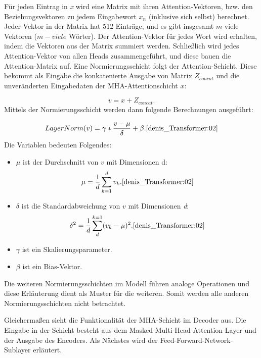 Für jeden Eintrag in \textit{x} wird eine Matrix mit ihren Attention-Vektoren, bzw. den Beziehungsvektoren zu jedem Eingabewort $x_n$ (inklusive sich selbst) berechnet. Jeder Vektor in der Matrix hat 512 Einträge, und es gibt insgesamt $m$-viele Vektoren ($m-viele$ Wörter). Der Attention-Vektor für jedes Wort wird erhalten, indem die Vektoren aus der Matrix summiert werden. Schließlich wird jedes Attention-Vektor von allen Heads zusammengeführt, und diese bauen die Attention-Matrix auf. Eine Normierungsschicht folgt der Attention-Schicht. Diese bekommt als Eingabe die konkatenierte Ausgabe von Matrix $Z_{concat}$ und die unveränderten Eingabedaten der MHA-Attentionschicht $x$:

\begin{equation}
	v = x + Z_{concat}.
\end{equation}
Mittels der Normierungsschicht werden dann folgende Berechnungen ausgeführt:

\begin{equation}
	LayerNorm(v) = \gamma * \frac{v - \mu}{\delta} + \beta. \cite{denis_Transformer:02}
\end{equation}
Die Variablen bedeuten Folgendes:

\begin{itemize}[leftmargin=1cm]
		\item $\mu$ ist der Durchschnitt von $v$ mit Dimensionen d:
		\begin{equation}
			\mu = \frac{1}{d}\sum_{k=1}^{d} v_k. \cite{denis_Transformer:02}
		\end{equation}
		\item $\delta$ ist die Standardabweichung von $v$ mit Dimensionen \textit{d}:
		\begin{equation}
			\delta^2 = \frac{1}{d}\sum_{d}^{k=1} (v_k - \mu)^2. \cite{denis_Transformer:02}
		\end{equation}
		\item $\gamma$ ist ein Skalierungsparameter.
		\item $\beta$ ist ein Bias-Vektor.
\end{itemize}

Die weiteren Normierungsschichten im Modell führen analoge Operationen und diese Erläuterung dient als Muster für die weiteren. Somit werden alle anderen Normierungsschichten nicht betrachtet.

Gleichermaßen sieht die Funktionalität der MHA-Schicht im Decoder aus. Die Eingabe in der Schicht besteht aus dem Masked-Multi-Head-Attention-Layer und der Ausgabe des Encoders. Als Nächstes wird der Feed-Forward-Network-Sublayer erläutert.

